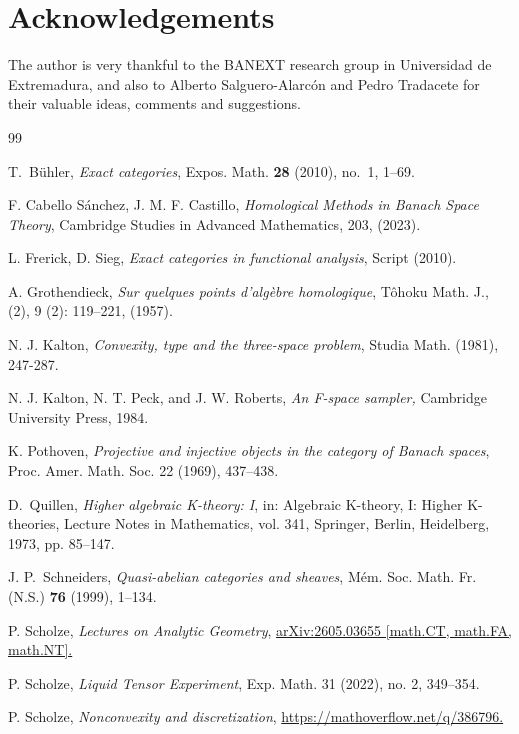\documentclass[12pt,a4paper]{amsproc}
\theoremstyle{remark}
\theoremstyle{definition}
\numberwithin{equation}{section}
\begin{document}
\section*{Acknowledgements}
The author is very thankful to the BANEXT research group in Universidad de Extremadura, and also to Alberto Salguero-Alarcón and Pedro Tradacete for their valuable ideas, comments and suggestions.

\begin{thebibliography}{99}

     T.~B{\"u}hler,
        \emph{Exact categories},
        Expos. Math. \textbf{28} (2010), no.~1, 1--69.
        
	 F. Cabello Sánchez, J. M. F. Castillo, \emph{Homological Methods in Banach Space Theory}, Cambridge Studies in Advanced Mathematics, 203, (2023).

	
	 L. Frerick, D. Sieg, \emph{Exact categories in functional analysis}, Script (2010).
	
	 A. Grothendieck, \emph{Sur quelques points d'algèbre homologique}, Tôhoku Math. J., (2), 9 (2): 119–221, (1957). 
	
	 N. J. Kalton, \emph{Convexity, type and the three-space problem}, Studia Math. (1981), 247-287. 
	
	 N. J. Kalton, N. T. Peck, and J. W. Roberts, \emph{An F-space sampler,} Cambridge University Press, 1984.
	
	
	 K. Pothoven, \emph{Projective and injective objects in the category of Banach spaces}, Proc. Amer. Math. Soc. 22 (1969), 437--438. 
    
        D.~Quillen,
    \emph{Higher algebraic {K}-theory: {I}},
    in: Algebraic {K}-theory, {I}: {H}igher {K}-theories,
    Lecture Notes in Mathematics, vol. 341,
    Springer, Berlin, Heidelberg, 1973, pp. 85--147.

J. P.~Schneiders,
\emph{Quasi-abelian categories and sheaves},
M{\'e}m. Soc. Math. Fr. (N.S.) \textbf{76} (1999), 1--134.

 P. Scholze, \emph{Lectures on Analytic Geometry}, \href{https://arxiv.org/abs/2605.03655}{arXiv:2605.03655 [math.CT, math.FA, math.NT].}


 P. Scholze, \emph{Liquid Tensor Experiment}, Exp. Math. 31 (2022), no. 2, 349--354.

 P. Scholze, \emph{Nonconvexity and discretization}, \href{https://mathoverflow.net/users/6074/peter-scholze}{https://mathoverflow.net/q/386796.}

\end{thebibliography}
\end{document}
